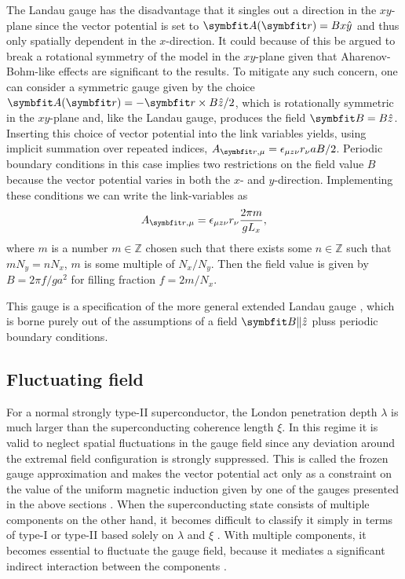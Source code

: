 The Landau gauge has the disadvantage that it singles out a direction in the $xy$-plane since the vector potential is set to $\v{A}(\v{r})=Bx\hat{y}$ and thus only spatially dependent
in the $x$-direction. It could because of this be argued to break a rotational symmetry of the model in the $xy$-plane given that Aharenov-Bohm-like effects are significant to the results.
To mitigate any such concern, one can consider a symmetric gauge given by the choice $\v{A}(\v{r}) = -\v{r}\times B\hat{z}/2$, which is rotationally symmetric in the $xy$-plane
and, like the Landau gauge, produces the field $\v{B} = B\hat{z}$.
Inserting this choice of vector potential into the link variables yields, using implicit summation over repeated indices,
$A_{\v{r},\mu} = \epsilon_{\mu z\nu}r_\nu aB/2$. Periodic boundary conditions in this case implies
two restrictions on the field value $B$ because the vector potential varies in both the $x$- and $y$-direction. Implementing these conditions we can write the link-variables as
\begin{equation}
    \label{eq:LM:Field:symmGaugeLinks}
    A_{\v{r},\mu} = \epsilon_{\mu z\nu}r_\nu\frac{2\pi m}{gL_x},
\end{equation}
where $m$ is a number $m\in\mathbb{Z}$ chosen such that there exists some $n\in\mathbb{Z}$ such that $mN_y=nN_x$, \ie $m$ is some multiple of $N_x/N_y$.
Then the field value is given by $B = 2\pi f/ga^2$ for filling fraction $f=2m/N_x$.

This gauge is a specification of the more general extended Landau gauge \cite{Nguyen99PRB,Nguyen99EPL}, which is borne purely out of the assumptions of a field $\v{B}\|\hat{z}$ pluss
periodic boundary conditions.

\subsection{Fluctuating field}

For a normal strongly type-II superconductor, the London penetration depth $\lambda$ is much larger than the superconducting coherence length $\xi$. In this regime it is valid to neglect
spatial fluctuations in the gauge field since any deviation around the extremal field configuration is strongly suppressed. This is called the frozen gauge approximation and
makes the vector potential act only as a constraint on the value of the uniform magnetic induction given by one of the gauges presented in the above sections \cite{Nguyen99PRB}.
When the superconducting state consists of multiple components on the other hand, it becomes difficult to classify it simply in terms of type-I or type-II based solely on
$\lambda$ and $\xi$ \cite{Babaev05}.
With multiple components, it becomes essential to fluctuate the gauge field, because it mediates a significant indirect interaction between the components \cite{Smorgrav05, Smiseth04}.

